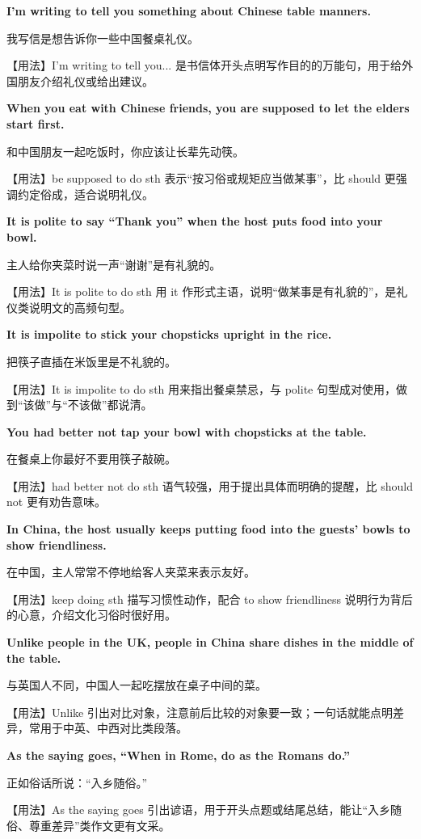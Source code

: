 \documentclass[UTF8,a4paper,11pt,oneside]{ctexbook}
\newcommand{\fansection}[1]{%
  \par\addvspace{2.4ex}%
  \Needspace{6\baselineskip}%
  \noindent{\sffamily\Large\bfseries\color{mainblue}#1}\par
  \nopagebreak
  \addvspace{0.2ex}%
  \noindent{\color{rulelight}\rule{\linewidth}{0.9pt}}\par
  \addvspace{0.9ex}%
  \nobreak
}
\newcommand{\fanpat}[3]{%
  \item{\bfseries #1}\par\nopagebreak
  {\small\color{textgray}#2}\par\nopagebreak
  {\footnotesize\color{accent!90!black}【用法】#3}\par
}
\begin{document}
\fansection{〇、本单元写作常用句型}
\begin{fanpatterns}
\fanpat{I'm writing to tell you something about Chinese table manners.}{我写信是想告诉你一些中国餐桌礼仪。}{I'm writing to tell you... 是书信体开头点明写作目的的万能句，用于给外国朋友介绍礼仪或给出建议。}

\fanpat{When you eat with Chinese friends, you are supposed to let the elders start first.}{和中国朋友一起吃饭时，你应该让长辈先动筷。}{be supposed to do sth 表示“按习俗或规矩应当做某事”，比 should 更强调约定俗成，适合说明礼仪。}

\fanpat{It is polite to say “Thank you” when the host puts food into your bowl.}{主人给你夹菜时说一声“谢谢”是有礼貌的。}{It is polite to do sth 用 it 作形式主语，说明“做某事是有礼貌的”，是礼仪类说明文的高频句型。}

\fanpat{It is impolite to stick your chopsticks upright in the rice.}{把筷子直插在米饭里是不礼貌的。}{It is impolite to do sth 用来指出餐桌禁忌，与 polite 句型成对使用，做到“该做”与“不该做”都说清。}

\fanpat{You had better not tap your bowl with chopsticks at the table.}{在餐桌上你最好不要用筷子敲碗。}{had better not do sth 语气较强，用于提出具体而明确的提醒，比 should not 更有劝告意味。}

\fanpat{In China, the host usually keeps putting food into the guests' bowls to show friendliness.}{在中国，主人常常不停地给客人夹菜来表示友好。}{keep doing sth 描写习惯性动作，配合 to show friendliness 说明行为背后的心意，介绍文化习俗时很好用。}

\fanpat{Unlike people in the UK, people in China share dishes in the middle of the table.}{与英国人不同，中国人一起吃摆放在桌子中间的菜。}{Unlike 引出对比对象，注意前后比较的对象要一致；一句话就能点明差异，常用于中英、中西对比类段落。}

\fanpat{As the saying goes, “When in Rome, do as the Romans do.”}{正如俗话所说：“入乡随俗。”}{As the saying goes 引出谚语，用于开头点题或结尾总结，能让“入乡随俗、尊重差异”类作文更有文采。}

\end{fanpatterns}

\fansection{一、满分范文}
\end{document}
